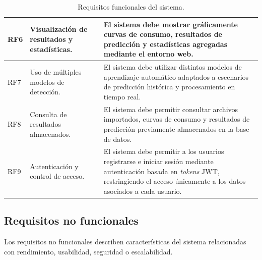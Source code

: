 \documentclass[12pt,a4paper]{report}
\begin{document}
\begin{table}[H]
\begin{tabular}{|p{2cm}|p{5cm}|p{7cm}|}
RF6 & Visualización de resultados y estadísticas. & El sistema debe mostrar gráficamente curvas de consumo, resultados de predicción y estadísticas agregadas mediante el entorno web. \\ \hline

RF7 & Uso de múltiples modelos de detección. & El sistema debe utilizar distintos modelos de aprendizaje automático adaptados a escenarios de predicción histórica y procesamiento en tiempo real. \\ \hline

RF8 & Consulta de resultados almacenados. & El sistema debe permitir consultar archivos importados, curvas de consumo y resultados de predicción previamente almacenados en la base de datos. \\ \hline

RF9 & Autenticación y control de acceso. & El sistema debe permitir a los usuarios registrarse e iniciar sesión mediante autenticación basada en \emph{tokens} JWT, restringiendo el acceso únicamente a los datos asociados a cada usuario. \\ \hline

\end{tabular}
\caption{Requisitos funcionales del sistema.}
\end{table}


\subsection{Requisitos no funcionales}

Los requisitos no funcionales describen características del sistema relacionadas con rendimiento, usabilidad, seguridad o escalabilidad.
\end{document}
